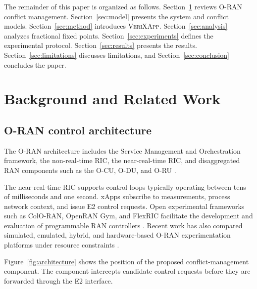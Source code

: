 \documentclass[pdflatex,sn-mathphys-num,iicol,oneside]{sn-jnl}
\newcommand{\method}{\textsc{VeriXApp}}
\begin{document}
The remainder of this paper is organized as follows.
Section~\ref{sec:background} reviews O-RAN conflict management.
Section~\ref{sec:model} presents the system and conflict models.
Section~\ref{sec:method} introduces \method.
Section~\ref{sec:analysis} analyzes fractional fixed points. Section~\ref{sec:experiments} defines the experimental protocol. Section~\ref{sec:results} presents the results.
Section~\ref{sec:limitations} discusses limitations, and
Section~\ref{sec:conclusion} concludes the paper.

\section{Background and Related Work}
\label{sec:background}

\subsection{O-RAN control architecture}

The O-RAN architecture includes the Service Management and
Orchestration framework, the non-real-time RIC, the near-real-time
RIC, and disaggregated RAN components such as the O-CU, O-DU, and
O-RU \cite{polese2023oran}.

The near-real-time RIC supports control loops typically operating
between tens of milliseconds and one second. xApps subscribe to
measurements, process network context, and issue E2 control requests.
Open experimental frameworks such as ColO-RAN, OpenRAN Gym, and
FlexRIC facilitate the development and evaluation of programmable
RAN controllers
\cite{polese2022coloran,bonati2023openrangym,
schmidt2021flexric}. Recent work has also compared simulated,
emulated, hybrid, and hardware-based O-RAN experimentation platforms
under resource constraints \cite{navarro2026testbeds}.

Figure~\ref{fig:architecture} shows the position of the proposed
conflict-management component. The component intercepts candidate
control requests before they are forwarded through the E2 interface.
\end{document}
